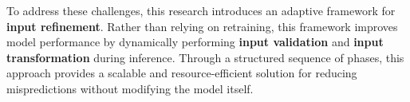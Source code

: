 

To address these challenges, this research introduces an adaptive framework for \textbf{input refinement}. Rather than relying on retraining, this framework improves model performance by dynamically performing \textbf{input validation} and \textbf{input transformation} during inference. Through a structured sequence of phases, this approach provides a scalable and resource-efficient solution for reducing mispredictions without modifying the model itself.


